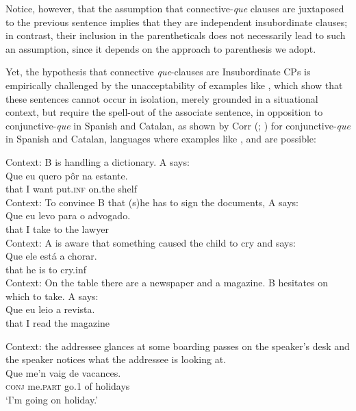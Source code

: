 \documentclass[output=paper,colorlinks,citecolor=brown,
]{langscibook}
\begin{document}
Notice, however, that the assumption that connective-\textit{que} clauses are juxtaposed to the previous sentence implies that they are independent insubordinate clauses; in contrast, their inclusion in the parentheticals does not necessarily lead to such an assumption, since it depends on the approach to parenthesis we adopt.

Yet, the hypothesis that connective \textit{que}-clauses are Insubordinate CPs is empirically challenged by the unacceptability of examples like , which show that these sentences cannot occur in isolation, merely grounded in a situational context, but require the spell-out of the associate sentence, in opposition to conjunctive-\textit{que} in Spanish and Catalan, as shown by Corr (\citeyear{corr_ibero-romance_2016}; \citeyear{corr_matrix_2018}) for conjunctive-\textit{que} in Spanish and Catalan, languages where examples like , and  are possible:

\ea \label{ex:matos:contexts-bad}
 \ea \label{ex:matos:context-bad-a}
 Context: B is handling a dictionary. A says:\\
 \gll {*} Que eu quero pôr na estante.\\
	  {} that I want put.\textsc{inf} on.the shelf\\
 \ex \label{ex:matos:context-bad-b}
 Context: To convince B that (s)he has to sign the documents, A says:\\
 \gll {*} Que eu levo para o advogado.\\
	  {} that I take to the lawyer\\
 \ex \label{ex:matos:context-bad-c}
 Context: A is aware that something caused the child to cry and says:\\
 \gll {*} Que ele está a chorar.\\
	  {} that he is to cry.{inf}\\
 \ex \label{ex:matos:context-bad-d}
 Context: On the table there are a newspaper and a magazine. B hesitates on which to take. A says:\\ 
 \gll {*} Que eu leio a revista.\\
 	  {} that I read the magazine\\
 \z
\z 

\ea \label{ex:matos:vacances}
Context: the addressee glances at some boarding passes on the speaker’s desk and the speaker notices what the addressee is looking at.\\
\gll Que me’n vaig de vacances. \\
	 \textsc{conj} me.\textsc{part} go.\textsc{1} of holidays\\
\glt ‘I’m going on holiday.’\\
	\citep[226]{corr_ibero-romance_2016}
\z 
\end{document}
